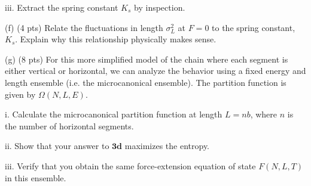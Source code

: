 \documentclass[10pt]{article}
\begin{document}
iii. Extract the spring constant $K_{s}$ by inspection.

(f) (4 pts) Relate the fluctuations in length $\sigma_{L}^{2}$ at $F=0$ to the spring constant, $K_{s}$. Explain why this relationship physically makes sense.

(g) (8 pts) For this more simplified model of the chain where each segment is either vertical or horizontal, we can analyze the behavior using a fixed energy and length ensemble (i.e. the microcanonical ensemble). The partition function is given by $\Omega(N, L, E)$.

i. Calculate the microcanonical partition function at length $L=n b$, where $n$ is the number of horizontal segments.

ii. Show that your answer to $\mathbf{3 d}$ maximizes the entropy.

iii. Verify that you obtain the same force-extension equation of state $F(N, L, T)$ in this ensemble.
\end{document}
